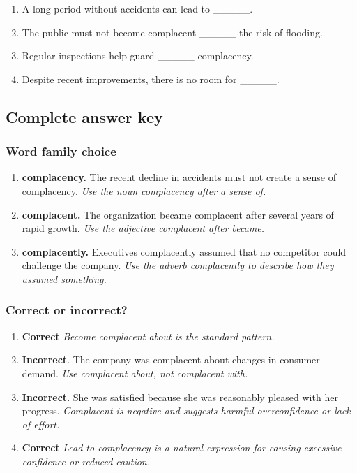 \documentclass[11pt]{article}
\begin{document}
\begin{enumerate}
  \item A long period without accidents can lead to \_\_\_\_\_.
  \item The public must not become complacent \_\_\_\_\_ the risk of flooding.
  \item Regular inspections help guard \_\_\_\_\_ complacency.
  \item Despite recent improvements, there is no room for \_\_\_\_\_.
\end{enumerate}

\subsection{Complete answer key}
\subsubsection{Word family choice}
\begin{enumerate}
  \item \textbf{complacency.} The recent decline in accidents must not create a sense of complacency. \emph{Use the noun complacency after a sense of.}
  \item \textbf{complacent.} The organization became complacent after several years of rapid growth. \emph{Use the adjective complacent after became.}
  \item \textbf{complacently.} Executives complacently assumed that no competitor could challenge the company. \emph{Use the adverb complacently to describe how they assumed something.}
\end{enumerate}

\subsubsection{Correct or incorrect?}
\begin{enumerate}
  \item \textbf{Correct} \emph{Become complacent about is the standard pattern.}
  \item \textbf{Incorrect}. The company was complacent about changes in consumer demand. \emph{Use complacent about, not complacent with.}
  \item \textbf{Incorrect}. She was satisfied because she was reasonably pleased with her progress. \emph{Complacent is negative and suggests harmful overconfidence or lack of effort.}
  \item \textbf{Correct} \emph{Lead to complacency is a natural expression for causing excessive confidence or reduced caution.}
\end{enumerate}
\end{document}
